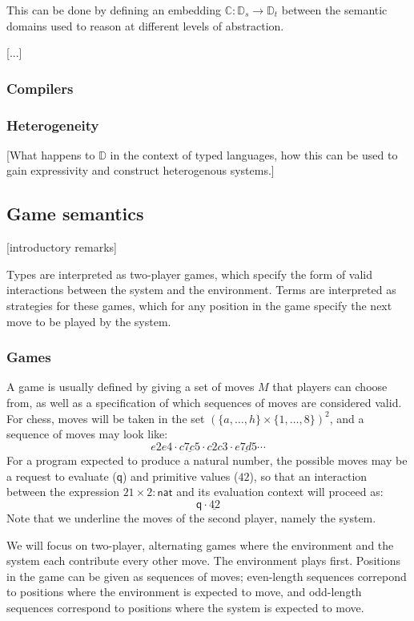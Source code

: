 \documentclass{article}
\newcommand{\kw}[1]{\ensuremath{ \mathsf{#1} }}
\begin{document}
This can be done by defining an embedding
$\mathbb{C} : \mathbb{D}_s \rightarrow \mathbb{D}_t$
between the semantic domains
used to reason at different levels of abstraction.

[...]

\subsubsection{Compilers}


\subsubsection{Heterogeneity}

[What happens to $\mathbb{D}$ in the context of typed languages,
how this can be used to gain expressivity and construct heterogenous systems.]


\subsection{Game semantics}

[introductory remarks]

Types are interpreted as two-player games,
which specify the form of valid interactions
between the system and the environment.
Terms are interpreted as strategies for these games,
which for any position in the game
specify the next move to be played by the system.

\subsubsection{Games}

A game is usually defined by giving a set of moves $M$
that players can choose from,
as well as a specification of which
sequences of moves are considered valid.
For chess,
moves will be taken in the set $(\{a, \ldots, h\} \times \{1, \ldots, 8\})^2$,
and a sequence of moves may look like:
\[ e2e4 \cdot \underline{c7c5} \cdot c2c3 \cdot \underline{e7d5} \cdots \]
For a program expected to produce a natural number,
the possible moves may be a request to evaluate ($\kw{q}$)
and primitive values ($42$),
so that an interaction between the expression $21 \times 2 : \kw{nat}$
and its evaluation context will proceed as:
\[ \kw{q} \cdot \underline{42} \]
Note that we underline the moves of the second player,
namely the system.

We will focus on two-player, alternating games
where the environment and the system each contribute every other move.
The environment plays first.
Positions in the game can be given
as sequences of moves;
even-length sequences correpond to positions
where the environment is expected to move,
and odd-length sequences correspond to positions
where the system is expected to move.
\end{document}
